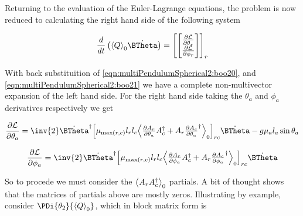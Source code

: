 Returning to the evaluation of the Euler-Lagrange equations, the problem is now reduced to calculating the right hand side of the following system

\begin{align}\label{eqn:multiPendulumSpherical2:boo23}
\frac{d}{dt} \left( \gpgradezero{Q} \dot{\BTheta} \right) =
{\begin{bmatrix}
\begin{bmatrix}
\PD{\theta_r}{\LL} \\
\PD{\phi_r}{\LL} \\
\end{bmatrix}
\end{bmatrix}}_r
\end{align}

With back substituition of \ref{eqn:multiPendulumSpherical2:boo20}, and \ref{eqn:multiPendulumSpherical2:boo21} we have a complete non-multivector expansion of the left hand side.  For the right hand side taking the $\theta_a$ and $\phi_a$ derivatives respectively we get

\begin{align}\label{eqn:multiPendulumSpherical2:boo6}
\PD{\theta_a}{\LL}
=
\inv{2} \dot{\BTheta}^\dagger
{\begin{bmatrix}
\mu_{\max(r,c)} l_r l_c \gpgradezero{
\PD{\theta_a}{A_r} A_c^\dagger
+A_r \PD{\theta_a}{A_c}^\dagger
}
\end{bmatrix}}_{rc} 
\dot{\BTheta}
-g \mu_a l_a \sin\theta_a 
\end{align}

\begin{align}\label{eqn:multiPendulumSpherical2:boo6c}
\PD{\phi_a}{\LL}
=
\inv{2} \dot{\BTheta}^\dagger
{\begin{bmatrix}
\mu_{\max(r,c)} l_r l_c \gpgradezero{
\PD{\phi_a}{A_r} A_c^\dagger
+A_r \PD{\phi_a}{A_c}^\dagger
}
\end{bmatrix}}_{rc} 
\dot{\BTheta}
\end{align}

So to procede we must consider the ${\left\langle{{A_r A_c^\dagger}}\right\rangle}_{0}$ partials.  A bit of thought shows that the matrices of partials above are mostly zeros.  Illustrating by example, consider $\PDi{\theta_2}{\gpgradezero{Q}}$, which in block matrix form is

